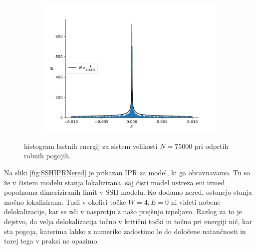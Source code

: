 \begin{figure}[H]
\centering
\begin{subfigure}{.9\textwidth}
\includegraphics[width=\linewidth]{Figures/DOS.pdf}
\end{subfigure}
\caption{histogram lastnih energij za sistem velikosti $N=75000$ pri odprtih robnih pogojih.}
\label{fig:dos}
\end{figure}

Na sliki \ref{fig:SSHIPRNered} je prikazan IPR za model, ki ga obravnavamo. Tu so že v čistem modelu stanja lokalizirana, saj čisti model ustreza eni izmed popolnoma dimeriziranih limit v SSH modelu. Ko dodamo nered, ostanejo stanja močno lokalizirana. Tudi v okolici točke $W=4, E=0$ ni videti nobene delokalizacije, kar se zdi v nasprotju z našo prejšnjo izpeljavo. Razlog za to je dejstvo, da velja delokalizacija točno v kritični točki in točno pri energiji nič, kar sta pogoja, katerima lahko z numeriko zadostimo le do določene natančnosti in torej tega v praksi ne opazimo.

